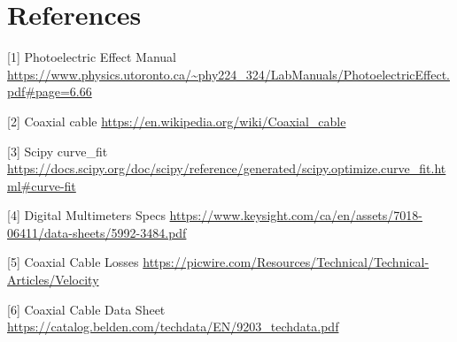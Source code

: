\documentclass[12pt]{article}
\begin{document}
\section{References}
[1] Photoelectric Effect Manual \url{https://www.physics.utoronto.ca/~phy224_324/LabManuals/PhotoelectricEffect.pdf#page=6.66}

[2] Coaxial cable \url{https://en.wikipedia.org/wiki/Coaxial_cable}

[3] Scipy curve\_fit \url{https://docs.scipy.org/doc/scipy/reference/generated/scipy.optimize.curve_fit.html#curve-fit}

[4] Digital Multimeters Specs \url{https://www.keysight.com/ca/en/assets/7018-06411/data-sheets/5992-3484.pdf}

[5] Coaxial Cable Losses \url{https://picwire.com/Resources/Technical/Technical-Articles/Velocity}

[6] Coaxial Cable Data Sheet \url{https://catalog.belden.com/techdata/EN/9203_techdata.pdf}
\end{document}
